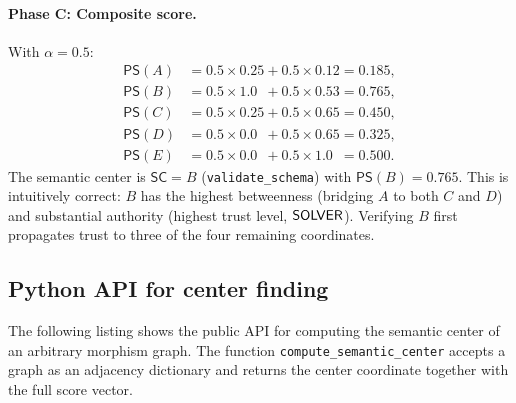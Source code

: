 \documentclass[11pt]{article}
\newcommand{\SC}{\mathsf{SC}}               %
\newcommand{\PropScore}{\mathsf{PS}}        %
\begin{document}
\paragraph{Phase C: Composite score.}
With $\alpha = 0.5$:
\begin{align*}
  \PropScore(A) &= 0.5 \times 0.25 + 0.5 \times 0.12 = 0.185, \\
  \PropScore(B) &= 0.5 \times 1.0\phantom{0} + 0.5 \times 0.53 = \mathbf{0.765}, \\
  \PropScore(C) &= 0.5 \times 0.25 + 0.5 \times 0.65 = 0.450, \\
  \PropScore(D) &= 0.5 \times 0.0\phantom{0} + 0.5 \times 0.65 = 0.325, \\
  \PropScore(E) &= 0.5 \times 0.0\phantom{0} + 0.5 \times 1.0\phantom{0} = 0.500.
\end{align*}
The semantic center is $\SC = B$ (\texttt{validate\_schema}) with
$\PropScore(B) = 0.765$.  This is intuitively correct: $B$ has the
highest betweenness (bridging $A$ to both $C$ and $D$) and substantial
authority (highest trust level, $\mathsf{SOLVER}$).  Verifying $B$ first
propagates trust to three of the four remaining coordinates.

\subsection{Python API for center finding}\label{sec:api-center}

The following listing shows the public API for computing the semantic
center of an arbitrary morphism graph.  The function
\texttt{compute\_semantic\_center} accepts a graph as an adjacency
dictionary and returns the center coordinate together with the full
score vector.
\end{document}
